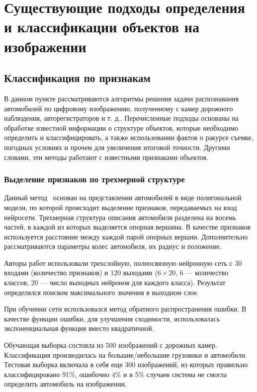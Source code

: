 \documentclass[a4paper,14pt]{extarticle} %
\begin{document}
\section{Существующие подходы определения и классификации объектов на изображении}

\subsection{Классификация по признакам}
\hspace{\parindent} В данном пункте рассматриваются алгоритмы решения задачи распознавания автомобилей по цифровому изображению, полученному с камер дорожного наблюдения, авторегистраторов и т. д.. Перечисленные подходы основаны на обработке известной информации о структуре объектов, которые необходимо определить и классифицировать, а также использовании фактов о ракурсе съемке, погодных условиях и прочем для увеличения итоговой точности. Другими словами, эти методы работают с известными признаками объектов.

\subsubsection{Выделение признаков по трехмерной структуре}
\hspace{\parindent} Данный метод~\cite{wu2001method} основан на представлении автомобилей в виде полигональной модели, по которой происходит выделение признаков, передаваемых на вход нейросети. Трехмерная структура описания автомобиля разделена на восемь частей, в каждой из которых выделяется опорная вершина. В качестве признаков используется расстояние между каждой парой опорных вершин. Дополнительно рассматриваются параметры колес автомобиля, их радиус и положение.

Авторы работ использовали трехслойную, полносвязную нейронную сеть с 30 входами (количество признаков) и 120 выходами ($6 \times 20$, 6 --- количество классов, 20 --- число выходных нейронов для каждого класса). Результат определялся поиском максимального значения в выходном слое. 

При обучении сети использовался метод обратного распространения ошибки. В качестве функции ошибки, для улучшения сходимости, использовалась экспоненциальная функция вместо квадратичной. 

Обучающая выборка состояла из 500 изображений с дорожных камер. Классификация производилась на большие/небольшие грузовики и автомобили. Тестовая выборка включала в себя еще 300 изображений, из которых правильно классифицировано 91\%, ошибочно 4\% и в 5\% случаев система не смогла определить автомобиль на изображении.
\end{document}

